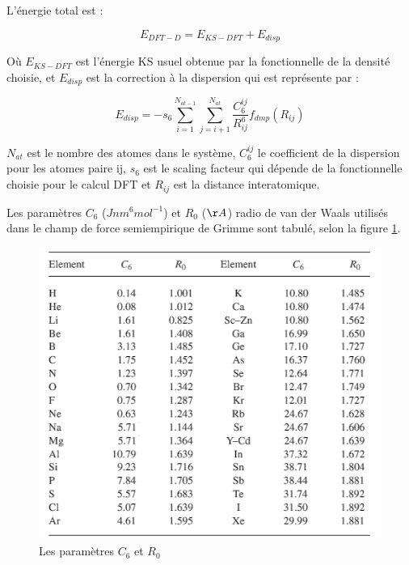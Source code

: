 	L'énergie total est : 
	
	\begin{equation}
	E_{DFT-D} = E_{KS-DFT} + E_{disp}
	\end{equation}
	
	Où $E_{KS-DFT}$ est l'énergie KS usuel obtenue par la fonctionnelle de la densité choisie, et $E_{disp}$ est la correction à la dispersion qui est représente par :
	
	\begin{equation}
	E_{disp}= -s_{6} \sum_{i=1}^{N_{at-1}} \sum_{j=i+1}^{N_{at}} \frac{C_{6}^{ij}}{R_{ij}^{6}} f_{dmp} (R_{ij})
	\end{equation}

  $N_{at}$ est le nombre des atomes dans le système, $C_{6}^{ij}$ le coefficient de la dispersion pour les atomes paire ij, $s_{6}$ est le scaling facteur qui dépende de la fonctionnelle choisie pour le calcul DFT et $R_{ij}$ est la distance interatomique. 
  
  Les paramètres $C_{6}$ ($Jnm^{6}mol^{-1}$) et $R_{0}$ ($\AA$) radio de van der Waals utilisés dans le champ de force semiempirique de Grimme sont tabulé, selon la figure \ref{Grimme-parametres}. 
  
  \begin{figure}[H]
  	\centering
  	\includegraphics[scale=0.8]{image/C6}
  	\caption[Les paramètres empiriques $C_{6}$ et $R_{0}$ pour DFT-D2]{Les paramètres $C_{6}$ et $R_{0}$} \label{Grimme-parametres}
  \end{figure}
	

